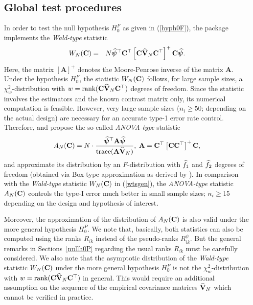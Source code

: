 \subsection{Global test procedures}
In order to test the null hypothesis $H_0^F$ as given in (\ref{hyph0F}), the 
 package implements the \textit{Wald-type} statistic 
\begin{eqnarray}
W_N(\mathbf{C}) &=& N \widehat{\bm{\psi}}^\top\mathbf{C}^\top\left[ \mathbf{C}
\mathbf{\widehat{V}}_N \mathbf{C}^\top  \right]^+ \mathbf{C} \widehat{\bm{\psi}}. 
\label{wtsgen}
\end{eqnarray}
Here, the matrix $[\mathbf{A}]^+$ denotes the Moore-Penrose inverse of the 
matrix $\mathbf{A}$. Under the hypothesis $H_0^F$, the statistic $W_N(\mathbf{C})$ 
follows, for large sample sizes, a $\chi_w^2$-distribution with $w = \rank(\vC 
\vwhV_N \vC^\top)$ degrees of freedom. Since the statistic 
involves the estimators and the known contrast matrix only, its numerical 
computation is feasible. However, very large sample sizes ($n_i\geq 50$; 
depending on the actual design) are necessary for an accurate type-1 error 
rate control. Therefore, \cite{akritas1997nonparametric} and 
\cite{brunner2017rank} propose the so-called \textit{ANOVA-type} statistic 
\begin{eqnarray}
A_N(\vC) = N \cdot \frac{\vwhpsi^\top \vA \vwhpsi }{\trace(\vA 
           \vwhV_N)}, \; \mathbf{A} = \mathbf{C}^\top\left[ 
					 \mathbf{C} \mathbf{C}^\top  \right]^+ \mathbf{C}, \label{atsgen}
\end{eqnarray}
and approximate its distribution by an $F$-distribution with $\widehat{f}_1$ and 
$\widehat{f}_2$ degrees of freedom (obtained via Box-type approximation as derived by 
\cite{brunner1997box}). In comparison with the \textit{Wald-type} statistic 
$W_N(\mathbf{C})$ in (\ref{wtsgen}), the \textit{ANOVA-type} statistic $A_N(\mathbf{C})$ 
controls the type-I error much better in small sample sizes; 
$n_i\geq 15$ depending on the design and hypothesis of interest.

Moreover, the approximation of the distribution of $A_N(\mathbf{C})$ is also valid 
under the more general hypothesis $H_0^P$. We note that, basically, both 
statistics can also be computed using the ranks $R_{ik}$ instead of the 
pseudo-ranks $R_{ik}^\psi$. But the general remarks in Sections~\ref{nullh0P} 
regarding the usual ranks $R_{ik}$ must be carefully considered. We also note 
that the asymptotic distribution of the \textit{Wald-type} statistic $W_N(\mathbf{C})$ 
under the more general hypothesis $H_0^P$ is not the $\chi_w^2$-distribution 
with $w = \rank(\vC \vwhV_N \vC^\top)$ in general. This would require an 
additional assumption on the sequence of the empirical covariance matrices 
$\mathbf{\widehat{V}}_N$ which cannot be verified in practice. 

